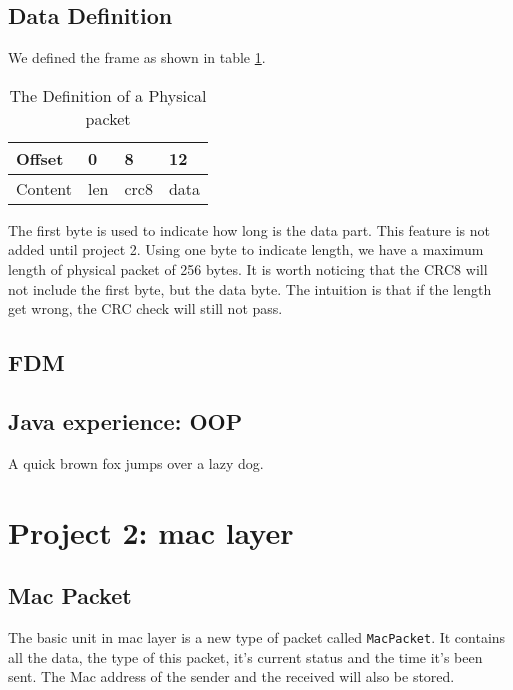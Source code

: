 \documentclass[conference,compsoc]{IEEEtran}
\begin{document}
	\subsection{Data Definition}
		We defined the frame as shown in table \ref{PhyLayer_dataDef}.
		\begin{table}[ht]
		\begin{center}\begin{tabular}{m{1cm}m{1cm}m{1cm}m{1cm}}\label{PhyLayer_dataDef}
		Offset                        & 0                        & 8                        & 12                        \\ \hline
		\multicolumn{1}{|l|}{Content} & \multicolumn{1}{l|}{len} & \multicolumn{1}{l|}{crc8} & \multicolumn{1}{l|}{data} \\ \hline
		\end{tabular}\end{center}
		\caption{The Definition of a Physical packet}
		\end{table}
		\par
		The first byte is used to indicate how long is the data part. 
		This feature is not added until project 2. 
		Using one byte to indicate length, we have a maximum length of physical packet of 256 bytes.
		It is worth noticing that the CRC8 will not include the first byte, but the data byte.
		The intuition is that if the length get wrong, the CRC check will still not pass.

	\subsection{FDM}

	\subsection{Java experience: OOP}
		A quick brown fox jumps over a lazy dog.

\section{Project 2: mac layer}
	
	\subsection{Mac Packet}
		The basic unit in mac layer is a new type of packet called \lstinline{MacPacket}. It contains all the data, the type of this packet, it's current status and the time it's been sent. The Mac address of the sender and the received will also be stored.
\end{document}
